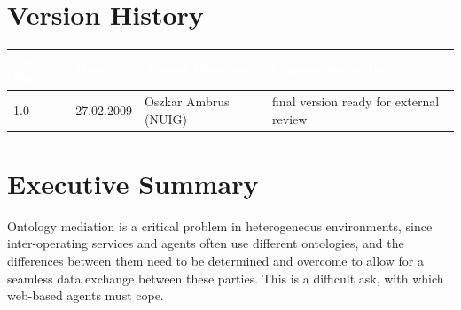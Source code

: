 \documentclass{fast_latex}
\begin{document}


\section*{Version History}

\begin{small}
\begin{tabular}{|l|l|l|p{7.5cm}|}
\hline
\rowcolor{fast@lightgrey}\textcolor{white}{\textbf{Rev. No.}} &
                            \textcolor{white}{\textbf{Date}} &
                            \textcolor{white}{\textbf{Author (Partner)}} &
							\textcolor{white}{\textbf{Change description}}\\ \hline
1.0 & 27.02.2009 & Oszkar Ambrus (NUIG) & final version ready for external review \\ \hline
\end{tabular}
\end{small}

\color{black}

\vfill

\newpage


\clearpage

\section*{Executive Summary}
\doublespacing
Ontology mediation is a critical problem in heterogeneous environments,
since inter-operating services and agents often use different
ontologies, and the differences between them need to be determined and
overcome to allow for a seamless data exchange between these parties.
This is a difficult ask, with which web-based agents must cope. 
\end{document}
